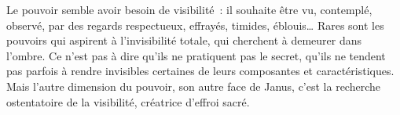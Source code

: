 \documentclass[11pt,twoside,openany]{book}
\newenvironment{lateiDocument}{}{}
\begin{document}
\begin{lateiDocument}
\begin{teiElement}[name={TEI},change={commons\_edition}]
\begin{teiElement}[name={text},type={book},xmlid={book}]
\begin{teiElement}[name={group},type={book},xmlid={book-001}]
\begin{teiElement}
\begin{teiElement}[name={body},xmlid={body-001}]
\begin{teiCit}[xmlid={cit04}]
            \begin{teiQuote}
Le pouvoir semble avoir besoin de visibilité : il souhaite être vu, contemplé, observé, par des regards respectueux, effrayés, timides, éblouis… Rares sont les pouvoirs qui aspirent à l’invisibilité totale, qui cherchent à demeurer dans l’ombre. Ce n’est pas à dire qu’ils ne pratiquent pas le secret, qu’ils ne tendent pas parfois à rendre invisibles certaines de leurs composantes et caractéristiques. Mais l’autre dimension du pouvoir, son autre face de Janus, c’est la recherche ostentatoire de la visibilité, créatrice d’effroi sacré.
\end{teiQuote}
          

\end{teiCit}
\end{teiElement}
\end{teiElement}
\end{teiElement}
\end{teiElement}
\end{teiElement}
\end{lateiDocument}
\end{document}
